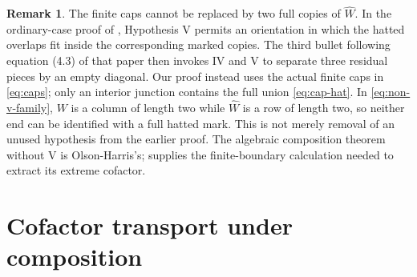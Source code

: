 \documentclass[11pt,a4paper]{amsart}
\numberwithin{equation}{section}
\theoremstyle{plain}
\theoremstyle{definition}
\newtheorem{remark}[theorem]{Remark}
\begin{document}
\begin{remark}\label{rem:comparison-v}
The finite caps cannot be replaced by two full copies of \(\widehat W\).  In the ordinary-case proof of \cite[p.~4457]{McNamara2009Classification}, Hypothesis V permits an orientation in which the hatted overlaps fit inside the corresponding marked copies.  The third bullet following equation (4.3) of that paper \cite[p.~4461]{McNamara2009Classification} then invokes IV and V to separate three residual pieces by an empty diagonal.  Our proof instead uses the actual finite caps in \eqref{eq:caps}; only an interior junction contains the full union \eqref{eq:cap-hat}.  In \eqref{eq:non-v-family}, \(W\) is a column of length two while \(\widehat W\) is a row of length two, so neither end can be identified with a full hatted mark.  This is not merely removal of an unused hypothesis from the earlier proof.  The algebraic composition theorem without V is Olson-Harris's;  supplies the finite-boundary calculation needed to extract its extreme cofactor.
\end{remark}

\section{Cofactor transport under composition}\label{sec:transport}
\end{document}
